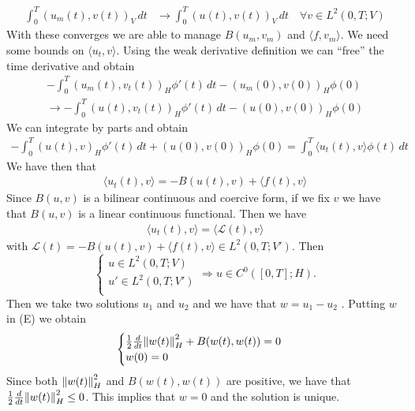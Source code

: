 \begin{enumerate}
\begin{align*}
              \int_0^T \left(u_m(t), v(t)\right)_V \, dt & \to \int_0^T \left(u(t), v(t)\right)_V \, dt \quad \forall v \in L^2(0, T; V)
          \end{align*}
          With these converges we are able to manage \(B(u_m, v_m)\) and \(\langle f, v_m \rangle\). We need some bounds on \(\langle u_t, v \rangle\). Using the weak derivative definition we can ``free'' the time derivative and obtain
          \[
              \begin{split}
                  - \int_0^T \left(u_m(t), v_t(t)\right)_H \phi'(t) \, dt - \left(u_m(0), v(0)\right)_H \phi(0) \\\to -\int_0^T \left(u(t), v_t(t)\right)_H \phi'(t) \, dt - \left(u(0), v(0)\right)_H \phi(0)
              \end{split}
          \]
          We can integrate by parts and obtain
          \[
              \begin{split}
                  -\int_0^T \left(u(t), v\right)_H \phi'(t) \, dt + \left(u(0), v(0)\right)_H \phi(0) = \int_0^T \langle u_t(t), v \rangle \phi(t) \, dt
              \end{split}
          \]
          We have then that
          \[
              \begin{split}
                  \langle u_t(t), v \rangle = - B(u(t), v) + \langle f(t), v \rangle
              \end{split}
          \]
          Since \(B(u,v)\) is a bilinear continuous and coercive form, if we fix \(v\) we
          have that \(B(u, v)\) is a linear continuous functional. Then we have
          \[
              \begin{split}
                  \langle u_t(t), v \rangle = \langle \mathcal{L}(t), v \rangle
              \end{split}
          \]
          with \(\mathcal{L}(t) = -B(u(t), v) + \langle f(t), v \rangle \in L^2(0, T;
          V')\). Then
          \[
              \begin{cases}
                  u \in L^2(0, T; V)   \\
                  u' \in L^2(0, T; V') \\
              \end{cases}
              \Rightarrow u \in C^0([0, T]; H).
          \]
          Then we take two solutions \(u_1\) and \(u_2\) and we have that \(w = u_1 -
          u_2\) . Putting \(w\) in (E) we obtain
          \[
              \begin{cases}
                  \frac{1}{2} \frac{d}{dt} \norm{w(t)}_H^2 + B(w(t), w(t)) = 0 \\
                  w(0) = 0
              \end{cases}
          \]
          Since both \(\norm{w(t)}_H^2\) and \(B(w(t), w(t))\) are positive, we have that
          \(\frac{1}{2} \frac{d}{dt} \norm{w(t)}_H^2 \leq 0\). This implies that \(w =
          0\) and the solution is unique.
\end{enumerate}

